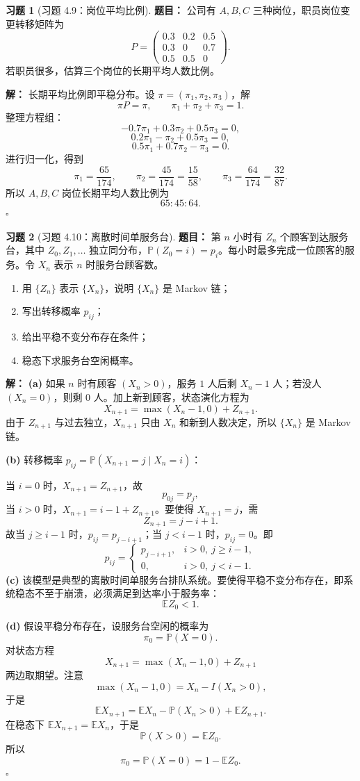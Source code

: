 \documentclass[12pt,a4paper,openany]{ctexrep}
\theoremstyle{definition}
\newtheorem{exercise}{习题}[section]
\newenvironment{solution}{\par\noindent\textbf{解：}}{\hfill$\square$\par}
\newcommand{\E}{\mathbb{E}}
\newcommand{\Pp}{\mathbb{P}}
\begin{document}
\begin{exercise}[习题 4.9：岗位平均比例]
\textbf{题目：}
公司有 $A,B,C$ 三种岗位，职员岗位变更转移矩阵为
\[
P=
\begin{pmatrix}
0.3&0.2&0.5\\
0.3&0&0.7\\
0.5&0.5&0
\end{pmatrix}.
\]
若职员很多，估算三个岗位的长期平均人数比例。
\end{exercise}
\begin{solution}
长期平均比例即平稳分布。设 $\pi=(\pi_1,\pi_2,\pi_3)$，解
\[
\pi P=\pi,\qquad \pi_1+\pi_2+\pi_3=1.
\]
整理方程组：
\[
-0.7\pi_1+0.3\pi_2+0.5\pi_3=0,
\]
\[
0.2\pi_1-\pi_2+0.5\pi_3=0,
\]
\[
0.5\pi_1+0.7\pi_2-\pi_3=0.
\]
进行归一化，得到
\[
\pi_1=\frac{65}{174},\qquad
\pi_2=\frac{45}{174}=\frac{15}{58},\qquad
\pi_3=\frac{64}{174}=\frac{32}{87}.
\]
所以 $A,B,C$ 岗位长期平均人数比例为
\[
65:45:64.
\]
\end{solution}

\begin{exercise}[习题 4.10：离散时间单服务台]
\textbf{题目：}
第 $n$ 小时有 $Z_n$ 个顾客到达服务台，其中 $Z_0,Z_1,\dots$ 独立同分布，$\Pp(Z_0=i)=p_i$。每小时最多完成一位顾客的服务。令 $X_n$ 表示 $n$ 时服务台顾客数。
\begin{enumerate}[label=(\alph*)]
	\item 用 $\{Z_n\}$ 表示 $\{X_n\}$，说明 $\{X_n\}$ 是 Markov 链；
	\item 写出转移概率 $p_{ij}$；
	\item 给出平稳不变分布存在条件；
	\item 稳态下求服务台空闲概率。
\end{enumerate}
\end{exercise}
\begin{solution}
\textbf{(a)} 如果 $n$ 时有顾客 $(X_n>0)$，服务 $1$ 人后剩 $X_n-1$ 人；若没人 $(X_n=0)$，则剩 $0$ 人。加上新到顾客，状态演化方程为
\[
X_{n+1}=\max(X_n-1,0)+Z_{n+1}.
\]
由于 $Z_{n+1}$ 与过去独立，$X_{n+1}$ 只由 $X_n$ 和新到人数决定，所以 $\{X_n\}$ 是 Markov 链。

\textbf{(b)} 转移概率 $p_{ij}=\Pp(X_{n+1}=j\mid X_n=i)$：

当 $i=0$ 时，$X_{n+1}=Z_{n+1}$，故
\[
p_{0j}=p_j,
\]
当 $i>0$ 时，$X_{n+1}=i-1+Z_{n+1}$。要使得 $X_{n+1}=j$，需
\[
Z_{n+1}=j-i+1.
\]
故当 $j\ge i-1$ 时，$p_{ij}=p_{j-i+1}$；当 $j<i-1$ 时，$p_{ij}=0$。即
\[
p_{ij}=
\begin{cases}
p_{j-i+1},&i>0,\ j\ge i-1,\\
0,&i>0,\ j<i-1.
\end{cases}
\]
\textbf{(c)} 该模型是典型的离散时间单服务台排队系统。要使得平稳不变分布存在，即系统稳态不至于崩溃，必须满足到达率小于服务率：
\[
\E Z_0<1.
\]

\textbf{(d)} 假设平稳分布存在，设服务台空闲的概率为
\[
\pi_0=\Pp(X=0).
\]
对状态方程
\[
X_{n+1}=\max(X_n-1,0)+Z_{n+1}
\]
两边取期望。注意
\[
\max(X_n-1,0)=X_n-I(X_n>0),
\]
于是
\[
\E X_{n+1}=\E X_n-\Pp(X_n>0)+\E Z_{n+1}.
\]
在稳态下 $\E X_{n+1}=\E X_n$，于是
\[
\Pp(X>0)=\E Z_0.
\]
所以
\[
\pi_0=\Pp(X=0)=1-\E Z_0.
\]
\end{solution}
\end{document}
